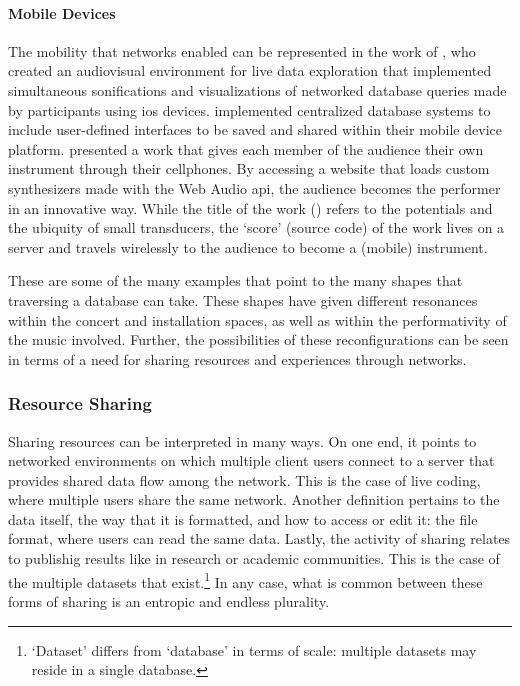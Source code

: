\paragraph{Mobile Devices}
The mobility that networks enabled can be represented in the work of 
\textcite{Liu:2013}, who created an audiovisual environment for live data exploration that implemented simultaneous sonifications and visualizations of networked database queries made by participants using \gls{ios} devices. \textcite{btaylor:2014} implemented centralized database systems to include user-defined interfaces to be saved and shared within their mobile device platform. \textcite{Rya17:OnT} presented a work that gives each member of the audience their own instrument through their cellphones. By accessing a website that loads custom synthesizers made with the Web Audio \gls{api}, the audience becomes the performer in an innovative way. While the title of the work (\textcite{Rya17:OnT}) refers to the potentials and the ubiquity of small transducers, the `score' (source code) of the work lives on a server and travels wirelessly to the audience to become a (mobile) instrument.

These are some of the many examples that point to the many shapes that traversing a database can take. These shapes have given different resonances within the concert and installation spaces, as well as within the performativity of the music involved. Further, the possibilities of these reconfigurations can be seen in terms of a need for sharing resources and experiences through networks.

\subsubsection{Resource Sharing}

Sharing resources can be interpreted in many ways. On one end, it points to networked environments on which multiple client users connect to a server that provides shared data flow among the network. This is the case of live coding, where multiple users share the same network. Another definition pertains to the data itself, the way that it is formatted, and how to access or edit it: the file format, where users can read the same data. Lastly, the activity of sharing relates to publishig results like in research or academic communities. This is the case of the multiple datasets that exist.\footnote{`Dataset' differs from `database' in terms of scale: multiple datasets may reside in a single database.} In any case, what is common between these forms of sharing is an entropic and endless plurality.

